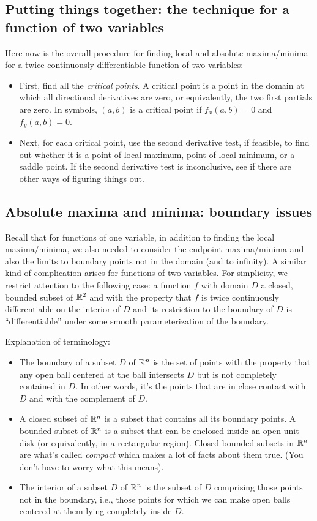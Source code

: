 \documentclass[10pt]{amsart}
\begin{document}
\subsection{Putting things together: the technique for a function of two variables}

Here now is the overall procedure for finding local and absolute
maxima/minima for a twice continuously differentiable function of two
variables:

\begin{itemize}
\item First, find all the {\em critical points}. A critical point is a
  point in the domain at which all directional derivatives are zero,
  or equivalently, the two first partials are zero. In symbols,
  $(a,b)$ is a critical point if $f_x(a,b) = 0$ and $f_y(a,b) = 0$.
\item Next, for each critical point, use the second derivative test,
  if feasible, to find out whether it is a point of local maximum,
  point of local minimum, or a saddle point. If the second derivative
  test is inconclusive, see if there are other ways of figuring things
  out.
\end{itemize}

\subsection{Absolute maxima and minima: boundary issues}

Recall that for functions of one variable, in addition to finding the
local maxima/minima, we also needed to consider the endpoint
maxima/minima and also the limits to boundary points not in the domain
(and to infinity). A similar kind of complication arises for functions
of two variables. For simplicity, we restrict attention to the
following case: a function $f$ with domain $D$ a closed, bounded
subset of $\mathbb{R}^2$ and with the property that $f$ is twice continuously
differentiable on the interior of $D$ and its restriction to the
boundary of $D$ is ``differentiable'' under some smooth
parameterization of the boundary.

Explanation of terminology:

\begin{itemize}
\item The boundary of a subset $D$ of $\mathbb{R}^n$ is the set of points with
  the property that any open ball centered at the ball intersects $D$
  but is not completely contained in $D$. In other words, it's the
  points that are in close contact with $D$ and with the complement of
  $D$.
\item A closed subset of $\mathbb{R}^n$ is a subset that contains all its
  boundary points. A bounded subset of $\mathbb{R}^n$ is a subset that can be
  enclosed inside an open unit disk (or equivalently, in a rectangular
  region). Closed bounded subsets in $\mathbb{R}^n$ are what's called {\em
  compact} which makes a lot of facts about them true. (You don't have
  to worry what this means).
\item The interior of a subset $D$ of $\mathbb{R}^n$ is the subset of $D$
  comprising those points not in the boundary, i.e., those points for
  which we can make open balls centered at them lying completely
  inside $D$.
\end{itemize}
\end{document}
